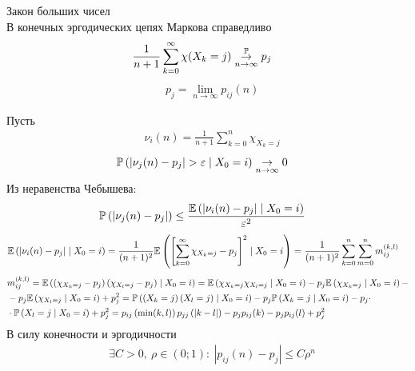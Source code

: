 \begin{theorem} Закон больших чисел
    \\
    В конечных эргодических цепях Маркова справедливо
    \begin{align*}
      & \frac{1}{n+1} \sum_{k=0}^\infty \chi(X_k=j) \overset{\mathbb{P}}{\underset{n \to \infty}\rightarrow} p_j
    \end{align*}
    \begin{align*}
      & p_j = \lim_{n \to \infty} p_{ij}(n)
    \end{align*}
\end{theorem}
\begin{Proof}
    Пусть
    \begin{align*}
      & \nu_i(n) = \frac{1}{n+1}\sum_{k=0}^n \chi_{X_k=j}
    \end{align*}
    \begin{align*}
      & \mathbb{P} \left( \left| \nu_j(n) - p_j \right| > \varepsilon \mid X_0=i \right) \underset{n \to \infty}\rightarrow 0
    \end{align*}
    Из неравенства Чебышева:
    \begin{align*}
      & \mathbb{P} \left( \left| \nu_j(n) - p_j \right| \right)\leq \frac{\mathbb{E}\left( \left| \nu_i(n) - p_j \right| \mid X_0=i \right)}{\varepsilon^2}
    \end{align*}
    \begin{align*}
      & \mathbb{E}\left( \left| \nu_i(n) - p_j \right| \mid X_0=i \right) = \frac{1}{(n+1)^2}\mathbb{E} \left( \left[ \sum_{k=0}^\infty \chi_{X_k=j}-p_j \right]^2 \mid X_0 = i \right) = \frac{1}{(n+1)^2}\sum_{k=0}^n\sum_{m=0}^nm_{ij}^{(k,l)}
    \end{align*}
    \begin{align*}
      & m_{ij}^{(k,l)} = \mathbb{E} \left( \left( \chi_{X_k=j}-p_j \right)\left( \chi_{X_l=j}-p_j \right) \mid X_0=i \right) = \mathbb{E} \left( \chi_{X_k=j} \chi_{X_l=j} \mid X_0=i \right) - p_j \mathbb{E} \left( \chi_{X_k=j} \mid X_0=i \right) - \\
      & - p_j \mathbb{E} \left( \chi_{X_l=j} \mid X_0=i \right) + p^2_j = \mathbb{P} \left( \left( X_k=j \right) \left( X_l=j \right) \mid X_0=i \right) - p_j \mathbb{P} \left( X_k=j \mid X_0=i \right) - p_j \cdot \\
      & \cdot\mathbb{P} \left( X_l=j \mid X_0=i \right) + p^2_j = p_{ij}\left( \min(k,l) \right)p_{jj}\left( \left| k-l \right| \right) - p_j p_{ij}(k) -p_jp_{ij}(l) + p^2_j
    \end{align*}
    В силу конечности и эргодичности
    \begin{align*}
      & \exists C> 0, \ \rho \in (0;1): \ \left| p_{ij}(n) - p_j \right| \leq C \rho^n

\end{align*}
\end{Proof}
